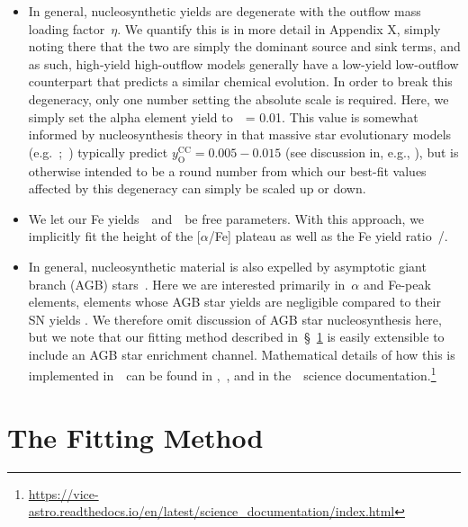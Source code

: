 \documentclass[ms.tex]{subfiles}
\begin{document}
\begin{itemize}

	\item In general, nucleosynthetic yields are degenerate with the outflow
	mass loading factor~$\eta$.
	We quantify this is in more detail in Appendix X, simply noting there that
	the two are simply the dominant source and sink terms, and as such,
	high-yield high-outflow models generally have a low-yield low-outflow
	counterpart that predicts a similar chemical evolution.
	In order to break this degeneracy, only one number setting the absolute
	scale is required.
	Here, we simply set the alpha element yield to~\yacc~= 0.01.
	This value is somewhat informed by nucleosynthesis theory in that
	massive star evolutionary models (e.g.~\citealp{Sukhbold2016,
	Limongi2018};~\citealp*{Nomoto2013}) typically predict
	$y_\text{O}^\text{CC} = 0.005 - 0.015$ (see discussion in, e.g.,
	\citealp{Weinberg2017, Johnson2020}), but is otherwise intended to be a
	round number from which our best-fit values affected by this degeneracy can
	simply be scaled up or down.

	\item We let our Fe yields~\yfecc~and~\yfeia~be free parameters.
	With this approach, we implicitly fit the height of the [$\alpha$/Fe]
	plateau as well as the Fe yield ratio~\yfecc/\yfeia.

	\item In general, nucleosynthetic material is also expelled by asymptotic
	giant branch (AGB) stars~\citep[e.g.][]{Cristallo2011, Cristallo2015,
	Ventura2013, Karakas2016, Karakas2018}.
	Here we are interested primarily in~$\alpha$ and Fe-peak elements, elements
	whose AGB star yields are negligible compared to their SN yields
	\citep[e.g.][]{Johnson2019}.
	We therefore omit discussion of AGB star nucleosynthesis here, but we note
	that our fitting method described in~\S~\ref{sec:fitting} is easily
	extensible to include an AGB star enrichment channel.
	Mathematical details of how this is implemented in~\vice~can be found in
	\citet{Johnson2020},~\citet{Johnson2022}, and in the~\vice~science
	documentation.\footnote{
		\url{https://vice-astro.readthedocs.io/en/latest/science_documentation/index.html}
	}

\end{itemize}


\section{The Fitting Method}
\label{sec:fitting}
\end{document}
